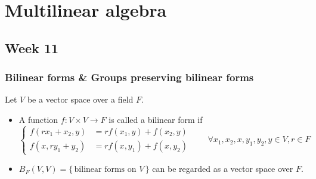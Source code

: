\section{Multilinear algebra}
\subsection{Week 11}
\subsubsection{Bilinear forms \& Groups preserving bilinear forms}

\begin{definition}
  Let $V$ be a vector space over a field $F$.
  \begin{itemize}
    \item A function $f: V \times V \to F$ is called a bilinear form if
      \[
        \begin{cases}
          f(rx_1 + x_2, y) &= rf(x_1, y) + f(x_2, y) \\
          f(x, ry_1 + y_2) &= rf(x, y_1) + f(x, y_2)
        \end{cases}
        \qquad \forall x_1, x_2, x, y_1, y_2, y \in V, r \in F
      \]
    \item $B_F(V, V) = \{\, \text{bilinear forms on $V$} \,\}$ can be regarded
      as a vector space over $F$.
  \end{itemize}
\end{definition}

